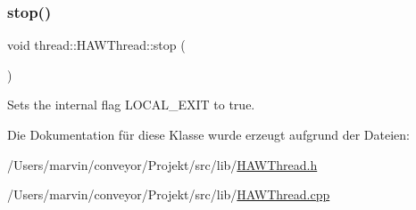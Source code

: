 \subsubsection{\texorpdfstring{stop()}{stop()}}
{\footnotesize\ttfamily void thread\+::\+H\+A\+W\+Thread\+::stop (\begin{DoxyParamCaption}{ }\end{DoxyParamCaption})}

Sets the internal flag L\+O\+C\+A\+L\+\_\+\+E\+X\+IT to true. 

Die Dokumentation für diese Klasse wurde erzeugt aufgrund der Dateien\+:\begin{DoxyCompactItemize}
\item 
/\+Users/marvin/conveyor/\+Projekt/src/lib/\hyperlink{_h_a_w_thread_8h}{H\+A\+W\+Thread.\+h}\item 
/\+Users/marvin/conveyor/\+Projekt/src/lib/\hyperlink{_h_a_w_thread_8cpp}{H\+A\+W\+Thread.\+cpp}\end{DoxyCompactItemize}
